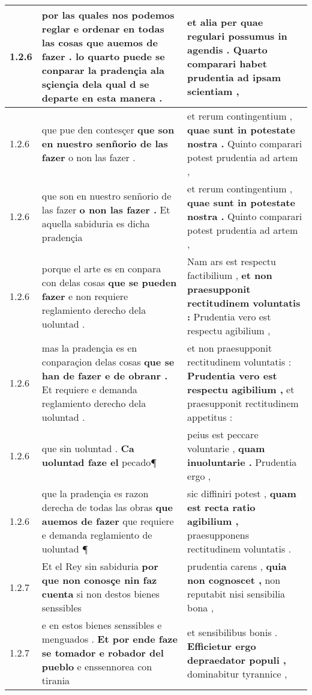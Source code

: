 \begin{tabular}{|p{1cm}|p{6.5cm}|p{6.5cm}|}
1.2.6 & por las quales nos podemos reglar e ordenar en todas las cosas \textbf{ que auemos de fazer . } lo quarto puede se conparar la pradençia ala sçiençia dela qual d se departe en esta manera . & et alia per quae regulari possumus in agendis . \textbf{ Quarto comparari habet prudentia } ad ipsam scientiam , \\\hline
1.2.6 & que pue den contesçer \textbf{ que son en nuestro senñorio de las fazer } o non las fazer . & et rerum contingentium , \textbf{ quae sunt in potestate nostra . } Quinto comparari potest prudentia ad artem , \\\hline
1.2.6 & que son en nuestro senñorio de las fazer \textbf{ o non las fazer . } Et aquella sabiduria es dicha pradençia & et rerum contingentium , \textbf{ quae sunt in potestate nostra . } Quinto comparari potest prudentia ad artem , \\\hline
1.2.6 & porque el arte es en conpara con delas cosas \textbf{ que se pueden fazer } e non requiere reglamiento derecho dela uoluntad . & Nam ars est respectu factibilium , \textbf{ et non praesupponit rectitudinem voluntatis : } Prudentia vero est respectu agibilium , \\\hline
1.2.6 & mas la pradençia es en conparaçion delas cosas \textbf{ que se han de fazer e de obranr . } Et requiere e demanda reglamiento derecho dela uoluntad . & et non praesupponit rectitudinem voluntatis : \textbf{ Prudentia vero est respectu agibilium , } et praesupponit rectitudinem appetitus : \\\hline
1.2.6 & que sin uoluntad . \textbf{ Ca uoluntad faze el } pecado¶ & peius est peccare voluntarie , \textbf{ quam inuoluntarie . } Prudentia ergo , \\\hline
1.2.6 & que la pradençia es razon derecha de todas las obras \textbf{ que auemos de fazer } que requiere e demanda reglamiento de uoluntad ¶ & sic diffiniri potest , \textbf{ quam est recta ratio agibilium , } praesupponens rectitudinem voluntatis . \\\hline
1.2.7 & Et el Rey sin sabiduria \textbf{ por que non conosçe nin faz cuenta } si non destos bienes senssibles & prudentia carens , \textbf{ quia non cognoscet , } non reputabit nisi sensibilia bona , \\\hline
1.2.7 & e en estos bienes senssibles e menguados . \textbf{ Et por ende faze se tomador e robador del pueblo } e enssennorea con tirania & et sensibilibus bonis . \textbf{ Efficietur ergo depraedator populi , } dominabitur tyrannice , \\\hline

\end{tabular}
